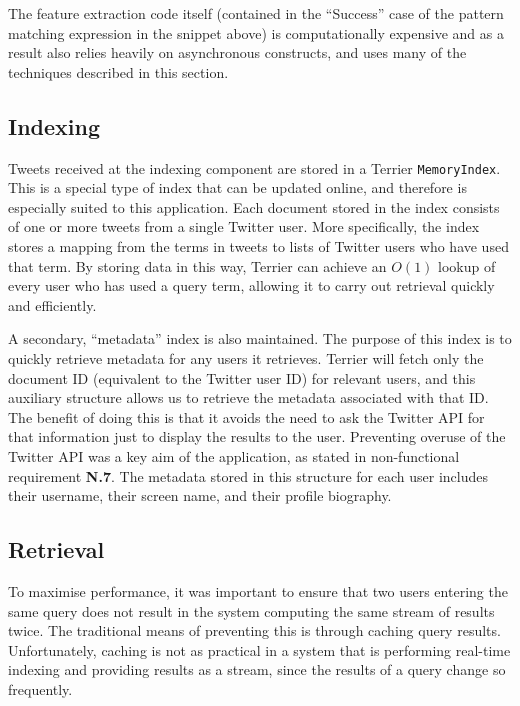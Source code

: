 \documentclass{l4proj}
\newcommand{\code}[1]{\texttt{#1}}
\begin{document}
The feature extraction code itself (contained in the ``Success'' case of the pattern matching expression in the snippet above) is computationally expensive and as a result also relies heavily on asynchronous constructs, and uses many of the techniques described in this section.

        \subsection{Indexing}
        Tweets received at the indexing component are stored in a Terrier \code{MemoryIndex}. This is a special type of index that can be updated  online, and therefore is especially suited to this application. Each document stored in the index consists of one or more tweets from a single Twitter user. More specifically, the index stores a mapping from the terms in tweets to lists of Twitter users who have used that term. By storing data in this way, Terrier can achieve an $O(1)$ lookup of every user who has used a query term, allowing it to carry out retrieval quickly and efficiently.
        
        A secondary, ``metadata'' index is also maintained. The purpose of this index is to quickly retrieve metadata for any users it retrieves. Terrier will fetch only the document ID (equivalent to the Twitter user ID) for relevant users, and this auxiliary structure allows us to retrieve the metadata associated with that ID. The benefit of doing this is that it avoids the need to ask the Twitter API for that information just to display the results to the user. Preventing overuse of the Twitter API was a key aim of the application, as stated in non-functional requirement \textbf{N.7}. The metadata stored in this structure for each user includes their username, their screen name, and their profile biography.
        
        \subsection{Retrieval}

        To maximise performance, it was important to ensure that two users entering the same query does not result in the system computing the same stream of results twice. The traditional means of preventing this is through caching query results. Unfortunately, caching is not as practical in a system that is performing real-time indexing and providing results as a stream, since the results of a query change so frequently.
        
\end{document}
